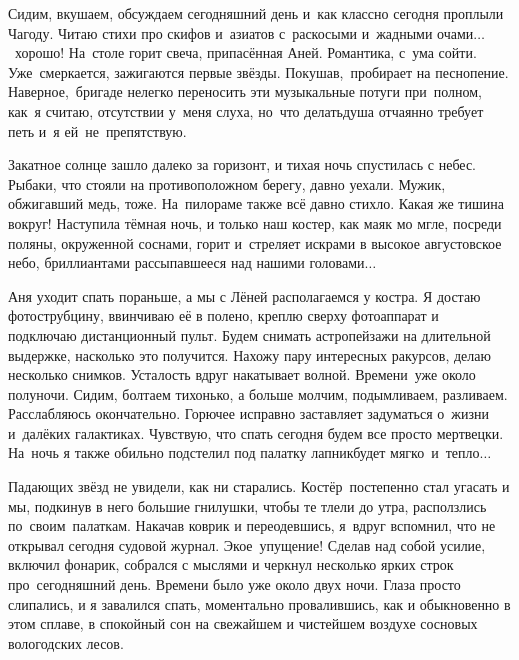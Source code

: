 Сидим, вкушаем, обсуждаем сегодняшний день и~как классно сегодня проплыли Чагоду. Читаю стихи про скифов и~азиатов с~раскосыми и~жадными очами$\ldots$~хорошо! На~столе горит свеча, припасённая Аней. Романтика, с~ума сойти. Уже~смеркается, зажигаются первые звёзды. Покушав,~пробирает на песнопение. Наверное,~бригаде нелегко переносить эти музыкальные потуги при~полном, как~я считаю, отсутствии у~меня слуха, но~что делать\mdash душа отчаянно требует петь и~я ей~не~препятствую. 

Закатное солнце зашло далеко за горизонт, и тихая ночь спустилась с небес. Рыбаки, что стояли на противоположном берегу, давно уехали. Мужик, обжигавший медь, тоже. На~пилораме также всё давно стихло. Какая же тишина вокруг! Наступила тёмная ночь, и только наш костер, как маяк мо мгле, посреди поляны, окруженной соснами, горит и~стреляет искрами в высокое августовское небо, бриллиантами рассыпавшееся над нашими головами$\ldots$

Аня уходит спать пораньше, а мы с Лёней располагаемся у костра. Я достаю фотострубцину, ввинчиваю её в полено, креплю сверху фотоаппарат и подключаю дистанционный пульт. Будем снимать астропейзажи на длительной выдержке, насколько это получится. Нахожу пару интересных ракурсов, делаю несколько снимков. Усталость вдруг накатывает волной. Времени~уже около полуночи. Сидим, болтаем тихонько, а больше молчим, подымливаем, разливаем. Расслабляюсь окончательно. Горючее исправно заставляет задуматься о~жизни и~далёких галактиках. Чувствую, что спать сегодня будем все просто мертвецки. На~ночь я также обильно подстелил под палатку лапник\mdash будет мягко~и~тепло$\ldots$
  
Падающих звёзд не увидели, как ни старались. Костёр~постепенно стал угасать и мы, подкинув в него большие гнилушки, чтобы те тлели до утра, расползлись по~своим~палаткам. Накачав коврик и переодевшись, я~вдруг вспомнил, что не открывал сегодня судовой журнал. Экое~упущение! Сделав над собой усилие, включил фонарик, собрался с мыслями и черкнул несколько ярких строк про~сегодняшний день. Времени было уже около двух ночи. Глаза просто слипались, и я завалился спать, моментально провалившись, как и обыкновенно в этом сплаве, в спокойный сон на свежайшем и чистейшем воздухе сосновых вологодских лесов.

\begin{center}
\end{center}